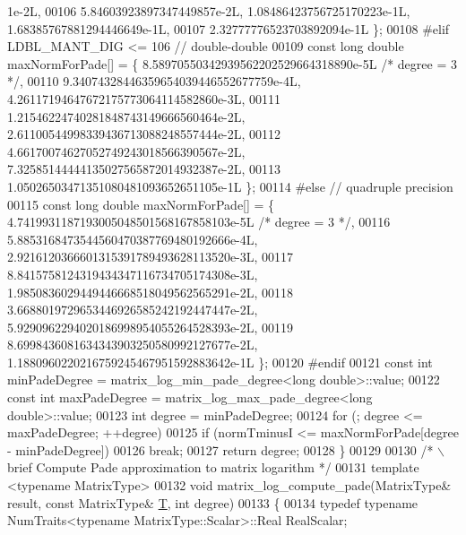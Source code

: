 \begin{DoxyCode}
      1e-2L,
00106             5.84603923897347449857e-2L, 1.08486423756725170223e-1L, 1.68385767881294446649e-1L,
00107             2.32777776523703892094e-1L \};
00108 \textcolor{preprocessor}{#elif LDBL\_MANT\_DIG <= 106        // double-double}
00109   \textcolor{keyword}{const} \textcolor{keywordtype}{long} \textcolor{keywordtype}{double} maxNormForPade[] = \{ 8.58970550342939562202529664318890e-5L \textcolor{comment}{/* degree = 3 */},
00110             9.34074328446359654039446552677759e-4L, 4.26117194647672175773064114582860e-3L,
00111             1.21546224740281848743149666560464e-2L, 2.61100544998339436713088248557444e-2L,
00112             4.66170074627052749243018566390567e-2L, 7.32585144444135027565872014932387e-2L,
00113             1.05026503471351080481093652651105e-1L \};
00114 \textcolor{preprocessor}{#else                             // quadruple precision}
00115   \textcolor{keyword}{const} \textcolor{keywordtype}{long} \textcolor{keywordtype}{double} maxNormForPade[] = \{ 4.7419931187193005048501568167858103e-5L \textcolor{comment}{/* degree = 3 */},
00116             5.8853168473544560470387769480192666e-4L, 2.9216120366601315391789493628113520e-3L,
00117             8.8415758124319434347116734705174308e-3L, 1.9850836029449446668518049562565291e-2L,
00118             3.6688019729653446926585242192447447e-2L, 5.9290962294020186998954055264528393e-2L,
00119             8.6998436081634343903250580992127677e-2L, 1.1880960220216759245467951592883642e-1L \};
00120 \textcolor{preprocessor}{#endif}
00121   \textcolor{keyword}{const} \textcolor{keywordtype}{int} minPadeDegree = matrix\_log\_min\_pade\_degree<long double>::value;
00122   \textcolor{keyword}{const} \textcolor{keywordtype}{int} maxPadeDegree = matrix\_log\_max\_pade\_degree<long double>::value;
00123   \textcolor{keywordtype}{int} degree = minPadeDegree;
00124   \textcolor{keywordflow}{for} (; degree <= maxPadeDegree; ++degree)
00125     \textcolor{keywordflow}{if} (normTminusI <= maxNormForPade[degree - minPadeDegree])
00126       \textcolor{keywordflow}{break};
00127   \textcolor{keywordflow}{return} degree;
00128 \}
00129 
00130 \textcolor{comment}{/* \(\backslash\)brief Compute Pade approximation to matrix logarithm */}
00131 \textcolor{keyword}{template} <\textcolor{keyword}{typename} MatrixType>
00132 \textcolor{keywordtype}{void} matrix\_log\_compute\_pade(MatrixType& result, \textcolor{keyword}{const} MatrixType& \hyperlink{group___sparse_core___module_class_eigen_1_1_triplet}{T}, \textcolor{keywordtype}{int} degree)
00133 \{
00134   \textcolor{keyword}{typedef} \textcolor{keyword}{typename} NumTraits<typename MatrixType::Scalar>::Real RealScalar;

\end{DoxyCode}
